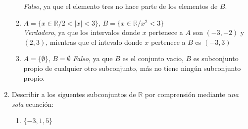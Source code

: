 \documentclass[a4paper,11pt]{article}
\newcommand{\real}{\mathbb{R}}
\begin{document}
\begin{enumerate}
\begin{enumerate}[label = \roman*)]
                    \textit{Falso}, ya que el elemento tres no hace parte de los elementos de $B$.
                \item $A=\{x\in \mathbb{R}/2<|x|<3\}$, $B=\{x\in \mathbb{R}/x^{2}<3\}$\\
                    \textit{Verdadero}, ya que los intervalos donde $x$ pertenece a $A$ son $(-3,-2)$ y $(2,3)$, mientras que el intevalo donde $x$ pertenece a $B$ es $(-3,3)$
                \item $A=\{\emptyset\}$, $B=\emptyset$
                    \textit{Falso}, ya que $B$ es el conjunto vacio, $B$ es subconjunto propio de cualquier otro subconjunto, m\'as no tiene ning\'un subconjunto propio.
            \end{enumerate}
        \item Describir a los siguentes subconjuntos de $\real$ por comprensi\'on mediante \textit{una sola} ecuaci\'on:
        \begin{enumerate}
            \item $\{-3,1,5\}$\\
            
        \end{enumerate}



    \end{enumerate}
\end{document}
